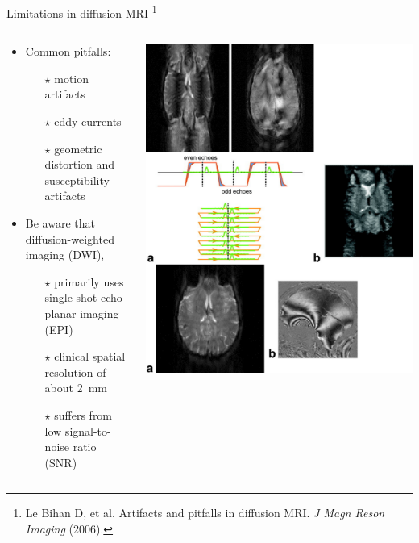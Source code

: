\documentclass[hyperref={colorlinks=true,linkcolor=blue}, aspectratio=169]{beamer}
\begin{document}
	\begin{frame}{Limitations in diffusion MRI \footnote{Le Bihan D, et al. Artifacts and pitfalls in diffusion MRI. \textit{J Magn Reson Imaging} (2006).}}
		\begin{columns}
			\begin{column}{0.6\textwidth}
				\begin{itemize}
					\item Common pitfalls:
					\begin{itemize}
						\item [$\star$] motion artifacts
						\item [$\star$] eddy currents
						\item [$\star$] geometric distortion and susceptibility artifacts
					\end{itemize}
					\vspace{2em}
					\item Be aware that diffusion-weighted imaging (DWI),
					\begin{itemize}
						\item [$\star$] primarily uses single-shot echo planar imaging (EPI)
						\item [$\star$] clinical spatial resolution of about \SI{2}{mm}
						\item [$\star$] suffers from low signal-to-noise ratio (SNR)
					\end{itemize}
				\end{itemize}
			\end{column}

			\begin{column}{0.4\textwidth}
				\includegraphics[height=0.8\textheight]{figures/diffusion_pitfalls.png}
			\end{column}
		\end{columns}


\end{frame}
\end{document}
